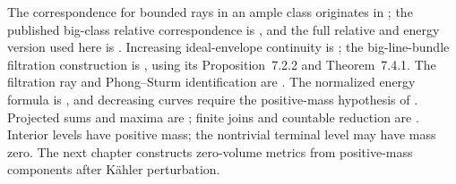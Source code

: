 \begin{remark}
\label{rem:rays-source-note}
The correspondence for bounded rays in an ample class originates in
\cite{RWN14}; the published big-class relative correspondence is
\cite[Theorem~2.6(ii)]{DXZ23}, and the full relative and energy version
used here is \cite[Theorem~9.2.1]{XiaBook}.
Increasing ideal-envelope continuity is
\cite[Proposition~3.2.13]{XiaBook}; the big-line-bundle filtration
construction is \cite[Example~9.3.1]{XiaBook}, using its
Proposition~7.2.2 and Theorem~7.4.1.
The filtration ray and Phong--Sturm identification are
\cite[Theorem~9.2]{RWN14}.
The normalized energy formula is
\cite[equation~(5), Theorem~2.6(iii)]{DXZ23}, and decreasing curves
require the positive-mass hypothesis of \cite[Lemma~2.8]{DXZ23}.
Projected sums and maxima are \cite[Lemmas~9.4.2--9.4.5]{XiaBook};
finite joins and countable reduction are
\cite[Definition~9.4.6, Proposition~9.4.5]{XiaBook}.
Interior levels have positive mass; the nontrivial terminal level
may have mass zero. The next chapter constructs zero-volume metrics
from positive-mass components after K\"ahler perturbation.

\end{remark}
